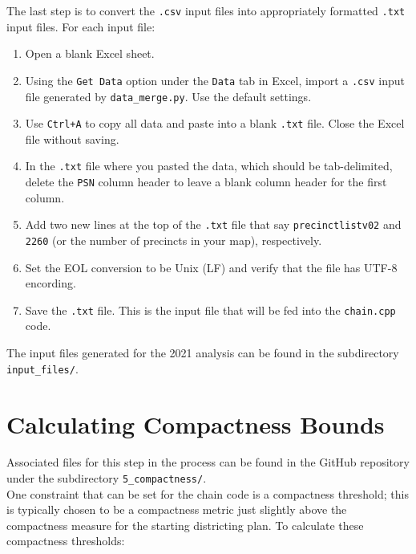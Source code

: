 \documentclass[11pt]{article}
\begin{document}
The last step is to convert the \verb|.csv| input files into appropriately formatted \verb|.txt| input files. For each input file:
\begin{enumerate}
	\item Open a blank Excel sheet.
	\item Using the \verb|Get Data| option under the \verb|Data| tab in Excel, import a \verb|.csv| input file generated by \verb|data_merge.py|. Use the default settings.
	\item Use \verb|Ctrl+A| to copy all data and paste into a blank \verb|.txt| file. Close the Excel file without saving.
	\item In the \verb|.txt| file where you pasted the data, which should be tab-delimited, delete the \verb|PSN| column header to leave a blank column header for the first column.
	\item Add two new lines at the top of the \verb|.txt| file that say \verb|precinctlistv02| and \verb|2260| (or the number of precincts in your map), respectively.
	\item Set the EOL conversion to be Unix (LF) and verify that the file has UTF-8 encording.
	\item Save the \verb|.txt| file. This is the input file that will be fed into the \verb|chain.cpp| code.
\end{enumerate}

The input files generated for the 2021 analysis can be found in the subdirectory \verb|input_files/|.

\section{Calculating Compactness Bounds}
Associated files for this step in the process can be found in the GitHub repository under the subdirectory \verb|5_compactness/|.\\

One constraint that can be set for the chain code is a compactness threshold; this is typically chosen to be a compactness metric just slightly above the compactness measure for the starting districting plan. To calculate these compactness thresholds:
\end{document}
